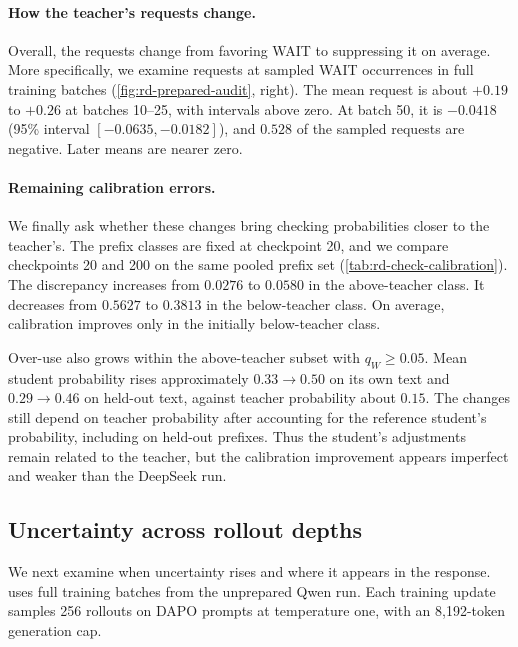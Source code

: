 \paragraph{How the teacher's requests change.}
Overall, the requests change from favoring WAIT to suppressing it on average. More specifically, we examine requests at sampled WAIT occurrences in full training batches (\cref{fig:rd-prepared-audit}, right). The mean request is about $+0.19$ to $+0.26$ at batches 10--25, with intervals above zero. At batch 50, it is $-0.0418$ (95\% interval $[-0.0635,-0.0182]$), and $0.528$ of the sampled requests are negative. Later means are nearer zero. 

\paragraph{Remaining calibration errors.}
We finally ask whether these changes bring checking probabilities closer to the teacher's. The prefix classes are fixed at checkpoint 20, and we compare checkpoints 20 and 200 on the same pooled prefix set (\cref{tab:rd-check-calibration}). The discrepancy increases from $0.0276$ to $0.0580$ in the above-teacher class. It decreases from $0.5627$ to $0.3813$ in the below-teacher class. On average, calibration improves only in the initially below-teacher class.

Over-use also grows within the above-teacher subset with $q_W\ge0.05$. Mean student probability rises approximately $0.33\to0.50$ on its own text and $0.29\to0.46$ on held-out text, against teacher probability about $0.15$. The changes still depend on teacher probability after accounting for the reference student's probability, including on held-out prefixes. Thus the student's adjustments remain related to the teacher, but the calibration improvement appears imperfect and weaker than the DeepSeek run.

\FloatBarrier
{}
\subsection{Uncertainty across rollout depths}
\label{app:rd-sensitivity}\label{app:broadcast-evidence}

We next examine when uncertainty rises and where it appears in the response.  uses full training batches from the unprepared Qwen run. Each training update samples 256 rollouts on DAPO prompts at temperature one, with an 8,192-token generation cap.

